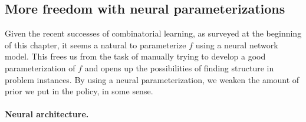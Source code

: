 \documentclass{report}
\theoremstyle{definition}
\theoremstyle{plain}
\newtheorem{proposition}{Proposition}[chapter]
\DeclareMathOperator*{\argmin}{arg\,min}
\begin{document}


\subsection{More freedom with neural parameterizations}\label{sec:neural-param}

Given the recent successes of combinatorial learning, as surveyed at the
beginning of this chapter, it seems a natural to parameterize $f$ using a neural
network model.
%
This frees us from the task of manually trying to develop a good
parameterization of $f$ and opens up the possibilities of finding structure in
problem instances. By using a neural parameterization, we weaken the amount of
prior we put in the policy, in some sense.

\paragraph{Neural architecture.}
\end{document}
